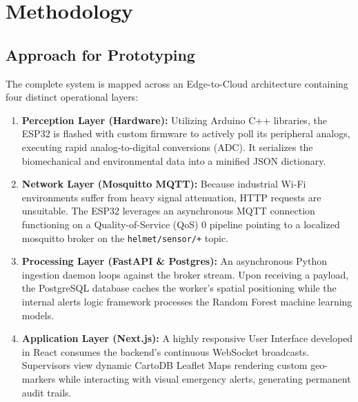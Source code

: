 \documentclass[11pt, conference, a4paper]{IEEEtran}
\begin{document}
\section{Methodology}

\subsection{Approach for Prototyping}
The complete system is mapped across an Edge-to-Cloud architecture containing four distinct operational layers:
\begin{enumerate}
    \item \textbf{Perception Layer (Hardware):} Utilizing Arduino C++ libraries, the ESP32 is flashed with custom firmware to actively poll its peripheral analogs, executing rapid analog-to-digital conversions (ADC). It serializes the biomechanical and environmental data into a minified JSON dictionary.
    \item \textbf{Network Layer (Mosquitto MQTT):} Because industrial Wi-Fi environments suffer from heavy signal attenuation, HTTP requests are unsuitable. The ESP32 leverages an asynchronous MQTT connection functioning on a Quality-of-Service (QoS) 0 pipeline pointing to a localized mosquitto broker on the \texttt{helmet/sensor/+} topic.
    \item \textbf{Processing Layer (FastAPI \& Postgres):} An asynchronous Python ingestion daemon loops against the broker stream. Upon receiving a payload, the PostgreSQL database caches the worker's spatial positioning while the internal alerts logic framework processes the Random Forest machine learning models.
    \item \textbf{Application Layer (Next.js):} A highly responsive User Interface developed in React consumes the backend's continuous WebSocket broadcasts. Supervisors view dynamic CartoDB Leaflet Maps rendering custom geo-markers while interacting with visual emergency alerts, generating permanent audit trails.
\end{enumerate}
\end{document}
